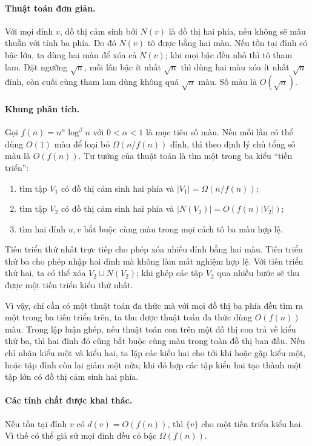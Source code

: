 \documentclass[11pt]{article}
\begin{document}
\paragraph{Thuật toán đơn giản.}
Với mọi đỉnh $v$, đồ thị cảm sinh bởi $N(v)$ là đồ thị hai phía, nếu không sẽ
mâu thuẫn với tính ba phía. Do đó $N(v)$ tô được bằng hai màu. Nếu tồn tại đỉnh
có bậc lớn, ta dùng hai màu để xóa cả $N(v)$; khi mọi bậc đều nhỏ thì tô tham
lam. Đặt ngưỡng $\sqrt n$, mỗi lần bậc ít nhất $\sqrt n$ thì dùng hai màu xóa
ít nhất $\sqrt n$ đỉnh, còn cuối cùng tham lam dùng không quá $\sqrt n$ màu.
Số màu là $O(\sqrt n)$.

\paragraph{Khung phân tích.}
Gọi $f(n)=n^\alpha\log^\beta n$ với $0<\alpha<1$ là mục tiêu số màu. Nếu mỗi
lần có thể dùng $O(1)$ màu để loại bỏ $\Omega(n/f(n))$ đỉnh, thì theo định lý
chủ tổng số màu là $O(f(n))$. Tư tưởng của thuật toán là tìm một trong ba kiểu
``tiến triển'':
\begin{enumerate}
  \item tìm tập $V_1$ có đồ thị cảm sinh hai phía và $|V_1|=\Omega(n/f(n))$;
  \item tìm tập $V_2$ có đồ thị cảm sinh hai phía và $|N(V_2)|=O(f(n)|V_2|)$;
  \item tìm hai đỉnh $u,v$ bắt buộc cùng màu trong mọi cách tô ba màu hợp lệ.
\end{enumerate}

Tiến triển thứ nhất trực tiếp cho phép xóa nhiều đỉnh bằng hai màu. Tiến triển
thứ ba cho phép nhập hai đỉnh mà không làm mất nghiệm hợp lệ. Với tiến triển
thứ hai, ta có thể xóa $V_2\cup N(V_2)$; khi ghép các tập $V_2$ qua nhiều bước
sẽ thu được một tiến triển kiểu thứ nhất.

Vì vậy, chỉ cần có một thuật toán đa thức mà với mọi đồ thị ba phía đều tìm ra
một trong ba tiến triển trên, ta thu được thuật toán đa thức dùng $O(f(n))$ màu.
Trong lập luận ghép, nếu thuật toán con trên một đồ thị con trả về kiểu thứ ba,
thì hai đỉnh đó cũng bắt buộc cùng màu trong toàn đồ thị ban đầu. Nếu chỉ nhận
kiểu một và kiểu hai, ta lặp các kiểu hai cho tới khi hoặc gặp kiểu một, hoặc
tập đỉnh còn lại giảm một nửa; khi đó hợp các tập kiểu hai tạo thành một tập
lớn có đồ thị cảm sinh hai phía.

\paragraph{Các tính chất được khai thác.}
Nếu tồn tại đỉnh $v$ có $d(v)=O(f(n))$, thì $\{v\}$ cho một tiến triển kiểu hai.
Vì thế có thể giả sử mọi đỉnh đều có bậc $\Omega(f(n))$.
\end{document}
